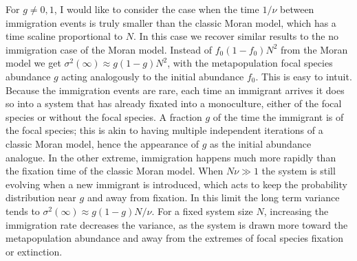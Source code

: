 For $g\neq 0,1$, I would like to consider the case when the time $1/\nu$ between immigration events is truly smaller than the classic Moran model, which has a time scaline proportional to $N$. 
In this case we recover similar results to the no immigration case of the Moran model. 
Instead of $f_0(1-f_0)N^2$ from the Moran model we get $\sigma^2(\infty) \approx g(1-g) N^2$, with the metapopulation focal species abundance $g$ acting analogously to the initial abundance $f_0$. 
This is easy to intuit. Because the immigration events are rare, each time an immigrant arrives it does so into a system that has already fixated into a monoculture, either of the focal species or without the focal species. 
A fraction $g$ of the time the immigrant is of the focal species; this is akin to having multiple independent iterations of a classic Moran model, hence the appearance of $g$ as the initial abundance analogue. %
%
%
%
In the other extreme, immigration happens much more rapidly than the fixation time of the classic Moran model. 
When $N\nu\gg 1$ the system is still evolving when a new immigrant is introduced, which acts to keep the probability distribution near $g$ and away from fixation. 
In this limit the long term variance tends to $\sigma^2(\infty) \approx g(1-g) N/\nu$. 
For a fixed system size $N$, increasing the immigration rate decreases the variance, as the system is drawn more toward the metapopulation abundance and away from the extremes of focal species fixation or extinction. 

